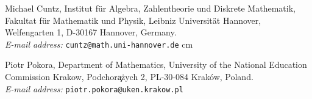 \documentclass[12pt]{article}
\theoremstyle{plain}
\theoremstyle{definition}
\begin{document}
Michael Cuntz,
Institut f\"ur Algebra, Zahlentheorie und Diskrete Mathematik, Fakultat f\"ur Mathematik und Physik, Leibniz Universit\"at Hannover, Welfengarten 1, D-30167 Hannover, Germany.\\
\nopagebreak
\textit{E-mail address:} \texttt{cuntz@math.uni-hannover.de}
 cm

Piotr Pokora,
Department of Mathematics,
University of the National Education Commission Krakow,
Podchor\c a\.zych 2,
PL-30-084 Krak\'ow, Poland. \\
\nopagebreak
\textit{E-mail address:} \texttt{piotr.pokora@uken.krakow.pl}
\end{document}

